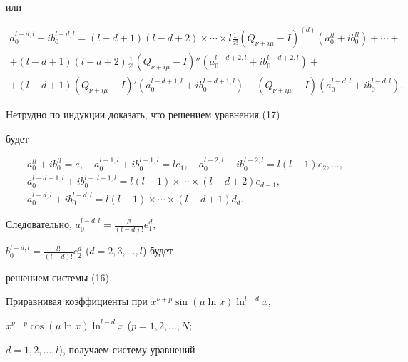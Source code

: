 или 


\begin{multline} 


a^{l-d,l}_0+ib^{l-d,l}_0=(l-d+1)(l-d+2)\times\dotsb\times l\frac{1}{d!}(Q_{\nu+i\mu} 


-I)^{(d)}(a^{ll}_0+ib^{ll}_0)+\dotsb+\\ 


+(l-d+1)(l-d+2)\frac{1}{2!}(Q_{\nu+i\mu}-I)'' 


(a^{l-d+2,l}_0+ib^{l-d+2,l}_0)+\\ 


+(l-d+1)(Q_{\nu+i\mu}-I)'(a^{l-d+1,l}_0+ib^{l-d+1,l}_0)+ 


(Q_{\nu+i\mu}-I)(a^{l-d,l}_0+ib^{l-d,l}_0). 


\end{multline} 


 


Нетрудно по индукции доказать, что решением уравнения (17) 


будет 


\begin{gather*} 


a^{ll}_0+ib^{ll}_0=e,\quad a^{l-1,l}_0+ib^{l-1,l}_0=le_1,\quad 


a^{l-2,l}_0+ib^{l-2,l}_0=l(l-1)e_2,\dotsc,\\ 


a^{l-d+1,l}_0+ib^{l-d+1,l}_0=l(l-1)\times\dotsb\times 


(l-d+2)e_{d-1},\\ 


a^{l-d,l}_0+ib^{l-d,l}_0=l(l-1)\times\dotsb\times 


(l-d+1)d_d. 


\end{gather*} 


 


Следовательно, $a^{l-d,l}_0=\frac{l!}{(l-d)!}e^d_1$, 


$b^{l-d,l}_0=\frac{l!}{(l-d)!}e^d_2$ ($d=2,3,\dotsc,l$) будет 


решением системы (16). 


 


Приравнивая коэффициенты при $x^{\nu+p}\sin(\mu\ln x)\ln^{l-d}x$, 


$x^{\nu+p}\cos(\mu\ln x)\ln^{l-d}x$ ($p=1,2,\dotsc,N$; 


$d=1,2,\dotsc,l$), получаем систему уравнений 


